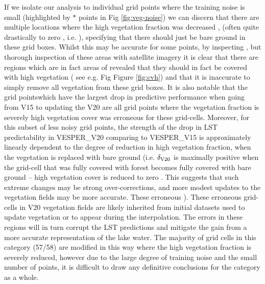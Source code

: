 \documentclass[hess, twostagejnl]{copernicus}
\providecommand{\DIFadd}[1]{{\protect\color{blue} \sf #1}} %
\providecommand{\DIFdel}[1]{{\protect\color{red} \scriptsize #1}} %
\providecommand{\DIFaddbegin}{} %
\providecommand{\DIFaddend}{} %
\providecommand{\DIFdelbegin}{} %
\providecommand{\DIFdelend}{} %
\begin{document}
\DIFadd{If we isolate our analysis to individual grid points where the training noise is small (highlighted by $*$ points in Fig \ref{fig:veg-noise}) we can discern that there are multiple locations where the high vegetation }\DIFaddend fraction was decreased \DIFdelbegin \DIFdel{, }\DIFdelend \DIFaddbegin \DIFadd{(}\DIFaddend often quite drastically to zero\DIFdelbegin \DIFdel{, i.e. }\DIFdelend \DIFaddbegin \DIFadd{), }\DIFaddend specifying that there should just be bare ground\DIFdelbegin \DIFdel{in these grid boxes. Whilst this may be accurate for some points, by inspecting }\DIFdelend \DIFaddbegin \DIFadd{, but thorough inspection of }\DIFaddend these areas with satellite imagery \DIFdelbegin \DIFdel{it is clear that there are regions which are in fact areas of }\DIFdelend \DIFaddbegin \DIFadd{revealed that they should in fact be covered with }\DIFaddend high vegetation (\DIFaddbegin \DIFadd{see }\DIFaddend e.g. \DIFdelbegin \DIFdel{Fig }\DIFdelend \DIFaddbegin \DIFadd{Figure }\DIFaddend \ref{fig:cvh}) and that \DIFdelbegin \DIFdel{it is inaccurate to simply remove all vegetation from these grid boxes. It is also notable that the  grid pointswhich have the largest drop in predictive performance when going from V15 to }\DIFdelend \DIFaddbegin \DIFadd{updating the }\DIFaddend V20 \DIFdelbegin \DIFdel{are all grid points where the vegetation fraction is severely }\DIFdelend \DIFaddbegin \DIFadd{high vegetation cover was erroneous for these grid-cells. Moreover, for this subset of less noisy grid points, the strength of the drop in LST predictability in VESPER\_V20 comparing to VESPER\_V15 is approximately linearly dependent to the degree of reduction in high vegetation fraction, when the vegetation is replaced with bare ground (i.e. $\delta_{\rm V20}$ is maximally positive when the grid-cell that was fully covered with forest becomes fully covered with bare ground – high vegetation cover is }\DIFaddend reduced to zero\DIFdelbegin \DIFdel{. This suggests that such extreme changes may be strong over-corrections, and more modest updates to the vegetation fields may be more accurate. These erroneous }\DIFdelend \DIFaddbegin \DIFadd{). These erroneous grid-cells in }\DIFaddend V20 vegetation fields are likely \DIFdelbegin \DIFdel{inherited from  initial datasets used to update vegetation or }\DIFdelend \DIFaddbegin \DIFadd{to appear }\DIFaddend during the interpolation. The errors in these regions will in turn corrupt the LST predictions and mitigate the gain from a more accurate representation of the lake water. \DIFaddbegin \DIFadd{The majority of grid cells in this category (57/58) are modified in this way where the high vegetation fraction is severely reduced, however due to the large degree of training noise and the small number of points, it is difficult to draw any definitive conclusions for the category as a whole.
}
\end{document}
